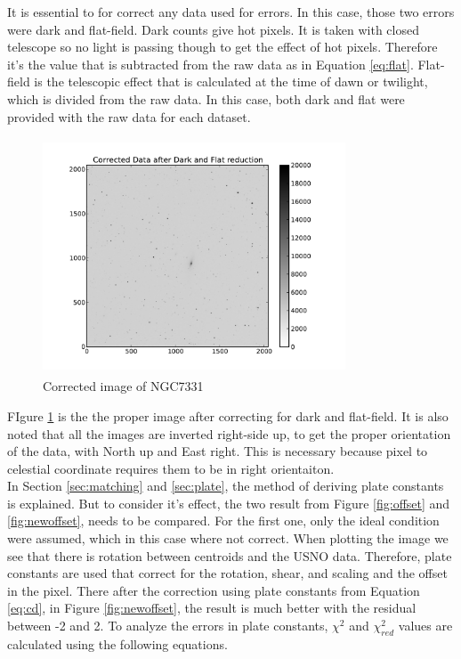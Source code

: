 \documentclass[a4paper,12pt]{article}
\begin{document}
It is essential to for correct any data used for errors. In this case, those two errors were dark and flat-field. Dark counts give hot pixels. It is taken with closed telescope so no light is passing though to get the effect of hot pixels. Therefore it's the value that is subtracted from the raw data as in Equation \ref{eq:flat}. Flat-field is the telescopic effect that is calculated at the time of dawn or twilight, which is divided from the raw data. In this case, both dark and flat were provided with the raw data for each dataset.
\begin{figure}[H]
\centering
	\includegraphics [angle=0,height=7cm,width=9cm]{galaxy/Corrected2.pdf} 
\caption{Corrected image of NGC7331}
\label{fig:correct}
\end{figure}
FIgure \ref{fig:correct} is the the proper image after correcting for dark and flat-field. It is also noted that all the images are inverted right-side up, to get the proper orientation of the data, with North up and East right. This is necessary because pixel to celestial coordinate requires them to be in right orientaiton. \\

\indent In Section \ref{sec:matching} and \ref{sec:plate}, the method of deriving plate constants is explained. But to consider it's effect, the two result from Figure \ref{fig:offset} and \ref{fig:newoffset}, needs to be compared. For the first one, only the ideal condition were assumed, which in this case where not correct. When plotting the image we see that there is rotation between centroids and the USNO data. Therefore, plate constants are used that correct for the rotation, shear, and scaling and the offset in the pixel. There after the correction using plate constants from Equation \ref{eq:cd}, in Figure \ref{fig:newoffset}, the result is much better with the residual between -2 and 2. To analyze the errors in plate constants, $\chi^2$ and $\chi_{red}^2$ values are calculated using the following equations.
\end{document}
